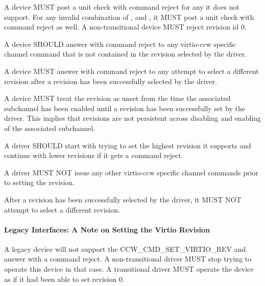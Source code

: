 A device MUST post a unit check with command reject for any 
it does not support. For any invalid combination of , 
and , it MUST post a unit check with command reject as well. A
non-transitional device MUST reject revision id 0.

A device SHOULD answer with command reject to any virtio-ccw specific
channel command that is not contained in the revision selected by the
driver.

A device MUST answer with command reject to any attempt to select a different revision
after a revision has been successfully selected by the driver.

A device MUST treat the revision as unset from the time the associated
subchannel has been enabled until a revision has been successfully set
by the driver. This implies that revisions are not persistent across
disabling and enabling of the associated subchannel.


A driver SHOULD start with trying to set the highest revision it
supports and continue with lower revisions if it gets a command reject.

A driver MUST NOT issue any other virtio-ccw specific channel commands
prior to setting the revision.

After a revision has been successfully selected by the driver, it
MUST NOT attempt to select a different revision.

\paragraph{Legacy Interfaces: A Note on Setting the Virtio Revision}\label{sec:Virtio Transport Options / Virtio over channel I/O / Device Initialization / Setting the Virtio Revision / Legacy Interfaces: A Note on Setting the Virtio Revision}

A legacy device will not support the CCW_CMD_SET_VIRTIO_REV and answer
with a command reject. A non-transitional driver MUST stop trying to
operate this device in that case. A transitional driver MUST operate
the device as if it had been able to set revision 0.

